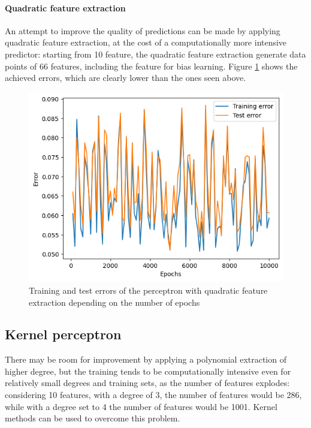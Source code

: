 \documentclass{article}
\begin{document}
\paragraph{Quadratic feature extraction}
An attempt to improve the quality of predictions can be made by applying quadratic feature extraction, at the cost of a computationally more intensive predictor: starting from 10 feature, the quadratic feature extraction generate data points of 66 features, including the feature for bias learning. 
Figure \ref{fig:quad_perceptron} shows the achieved errors, which are clearly lower than the ones seen above.

\begin{figure}
	\centering
	\includegraphics[width=0.5\columnwidth]{../plots/quad_perceptron.png}
	\caption{Training and test errors of the perceptron with quadratic feature extraction depending on the number of epochs}
	\label{fig:quad_perceptron}
\end{figure}

\subsection{Kernel perceptron}
There may be room for improvement by applying a polynomial extraction of higher degree, but the training tends to be computationally intensive even for relatively small degrees and training sets, as the number of features explodes: considering 10 features, with a degree of 3, the number of features would be 286, while with a degree set to 4 the number of features would be 1001. Kernel methods can be used to overcome this problem. 
\end{document}
